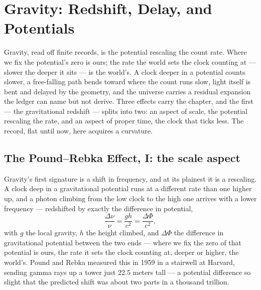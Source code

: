 \chapter{Gravity: Redshift, Delay, and Potentials}
\label{chap:gravity-redshift-delay-potentials}

Gravity, read off finite records, is the potential rescaling the count rate. Where we fix the potential's zero is
ours; the rate the world sets the clock counting at --- slower the deeper it sits --- is the world's. A clock
deeper in a potential counts slower, a free-falling path bends toward where the count runs slow, light itself is
bent and delayed by
the geometry, and the universe carries a residual expansion the ledger can name but not derive. Three effects
carry the chapter, and the first --- the gravitational redshift --- splits into two: an aspect of scale, the
potential rescaling the rate, and an aspect of proper time, the clock that ticks less. The record, flat until
now, here acquires a curvature.

\section{The Pound--Rebka Effect, I: the scale aspect}
\label{se:pound-rebka-scale}

Gravity's first signature is a shift in frequency, and at its plainest it is a rescaling. A clock deep
in a gravitational potential runs at a different rate than one higher up, and a photon climbing from the low
clock to the high one arrives with a lower frequency --- redshifted by exactly the difference in potential,
\begin{equation}
  \frac{\Delta\nu}{\nu} = \frac{gh}{c^2} = \frac{\Delta\Phi}{c^2},
\end{equation}
with $g$ the local gravity, $h$ the height climbed, and $\Delta\Phi$ the difference in gravitational potential
between the two ends --- where we fix the zero of that potential is ours, the rate it sets the clock counting at,
deeper or higher, the world's. Pound and Rebka measured this in 1959 in a stairwell at Harvard, sending gamma rays up a
tower just $22.5$ meters tall --- a potential difference so slight that the predicted shift was about two parts
in a thousand trillion.

